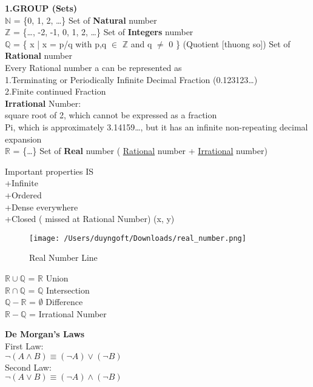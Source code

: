 \documentclass{amsart}
\begin{document}
\noindent
\textbf{1.GROUP (Sets)}\\[20pt]
$\mathbb{N}$ = \{0, 1, 2, \dots\} Set of \textbf{Natural} number\\
$\mathbb{Z}$ =  \{\dots, -2, -1, 0, 1, 2, \dots \} Set of \textbf{Integers} number\\
$\mathbb{Q}$ = \{ x | x = p/q with p,q $\in$  $\mathbb{Z}$ and q $\neq$ 0 \} (Quotient [thuong so]) Set of \textbf{Rational} number\\
Every Rational number a can be represented as\\
1.Terminating or Periodically Infinite Decimal Fraction (0.123123\dots)\\
2.Finite continued Fraction\\
\textbf{Irrational} Number:\\
square root of 2, which cannot be expressed as a fraction\\
Pi, which is approximately 3.14159\dots, but it has an infinite non-repeating decimal expansion\\
$\mathbb{R}$ = \{\dots\} Set of \textbf{Real} number ( \underline{Rational} number + \underline{Irrational} number)

Important properties IS\\
+Infinite\\
+Ordered\\
+Dense everywhere\\
+Closed ( missed at Rational Number) (x, y)

\begin{figure}[h]
  \centering
  \texttt{[image: /Users/duyngoft/Downloads/real\_number.png]}
  \caption{Real Number Line}
  \label{fig:sample-image}
\end{figure}

\begin{flushleft}
$\mathbb{R} \cup \mathbb{Q}$ = $\mathbb{R}$ Union\\
$\mathbb{R} \cap \mathbb{Q}$ = $\mathbb{Q}$ Intersection\\
$\mathbb{Q} - \mathbb{R}$ = $\emptyset$ Difference\\
$\mathbb{R} - \mathbb{Q}$ = Irrational Number\\
\end{flushleft}

\begin{flushleft}
\textbf{De Morgan's Laws}\\[20pt]
First Law: \\
$\neg (A \land B) \equiv (\neg A) \lor (\neg B)$\\[10pt]
Second Law: \\
$\neg (A \lor B) \equiv (\neg A) \land (\neg B)$\\
\end{flushleft}
\end{document}
